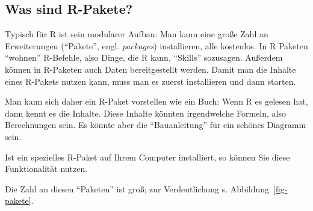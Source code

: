 \documentclass[
  a4paper,
  DIV=11]{scrreprt}
\theoremstyle{definition}
\theoremstyle{definition}
\theoremstyle{definition}
\theoremstyle{remark}
\begin{document}
\subsection{Was sind R-Pakete?}\label{was-sind-r-pakete}

Typisch für R ist sein modularer Aufbau: Man kann eine große Zahl an
Erweiterungen (``Pakete'', engl. \emph{packages}) installieren, alle
kostenlos. In R Paketen ``wohnen'' R-Befehle, also Dinge, die R kann,
``Skills'' sozusagen. Außerdem können in R-Paketen auch Daten
bereitgestellt werden. Damit man die Inhalte eines R-Pakets nutzen kann,
muss man es zuerst installieren und dann starten.

Man kann sich daher ein R-Paket vorstellen wie ein Buch: Wenn R es
gelesen hat, dann kennt es die Inhalte. Diese Inhalte könnten
irgendwelche Formeln, also Berechnungen sein. Es könnte aber die
``Bauanleitung'' für ein schönes Diagramm sein.

Ist ein spezielles R-Paket auf Ihrem Computer installiert, so können Sie
diese Funktionalität nutzen.

Die Zahl an diesen ``Paketen'' ist groß; zur Verdeutlichung s.
Abbildung~\ref{fig-pakete}.
\end{document}

